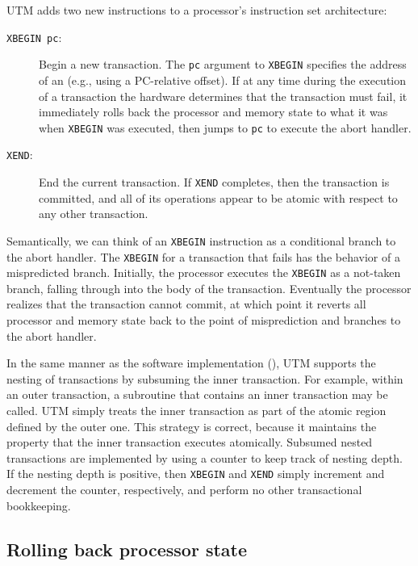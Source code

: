 UTM adds two new instructions to a processor's instruction set
architecture:
\begin{description}
\item[\texttt{XBEGIN pc}:] Begin a new transaction.  The
\texttt{pc} argument to \texttt{XBEGIN} specifies
the address of an  (e.g., using a PC-relative offset).
If at any time during the execution of a transaction the hardware determines
that the transaction must fail, it immediately rolls back the
processor and memory state to what it was when \texttt{XBEGIN} was
executed, then jumps to \texttt{pc} to execute the abort handler.
 
\item[\texttt{XEND}:] End the current transaction.  If \texttt{XEND}
completes, then the transaction is committed, and all of its
operations appear to be atomic with respect to any other transaction.
\end{description}

Semantically, we can think of an \texttt{XBEGIN} instruction as a
conditional branch to the abort handler.  The \texttt{XBEGIN} for a
transaction that fails has the behavior of a mispredicted branch.
Initially, the processor executes the \texttt{XBEGIN} as a not-taken
branch, falling through into the body of the transaction.  Eventually
the processor realizes that the transaction cannot commit, at which
point it reverts all processor and memory state back to the point of
misprediction and branches to the abort handler.

In the same manner as the \apex software implementation (),
UTM supports the nesting of transactions by subsuming the inner
transaction.  For example, within an outer transaction, a
subroutine that contains an inner transaction may be called.
UTM simply treats the inner transaction as part of the atomic
region defined by the outer one.  This strategy is correct, because it
maintains the property that the inner transaction executes atomically.
Subsumed nested transactions are implemented by using a counter to
keep track of nesting depth.  If the nesting depth is positive, then
\texttt{XBEGIN} and \texttt{XEND} simply increment and decrement the
counter, respectively, and perform no other transactional bookkeeping.

\subsection{Rolling back processor state}

